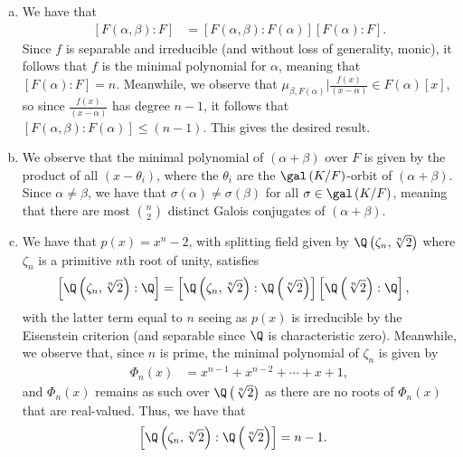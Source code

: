 \documentclass[10pt]{mypackage}
\begin{document}
\begin{solution}\hfill
  \begin{enumerate}[(a)]
    \item We have that
      \begin{align*}
        \left[ F\left( \alpha,\beta \right):F \right] &= \left[ F\left( \alpha,\beta \right):F\left( \alpha \right) \right]\left[ F\left( \alpha \right):F \right].
      \end{align*}
      Since $f$ is separable and irreducible (and without loss of generality, monic), it follows that $f$ is the minimal polynomial for $\alpha$, meaning that $\left[ F\left( \alpha \right):F \right] = n$. Meanwhile, we observe that $\mu_{\beta,F\left( \alpha \right)} | \frac{f(x)}{\left( x-\alpha \right)}\in F\left( \alpha \right)\left[ x \right]$, so since $\frac{f\left( x \right)}{\left( x-\alpha \right)}$ has degree $n-1$, it follows that $\left[ F\left( \alpha,\beta \right):F\left( \alpha \right) \right]\leq \left( n-1 \right)$. This gives the desired result.
    \item We observe that the minimal polynomial of $\left( \alpha + \beta \right)$ over $F$ is given by the product of all $\left( x-\theta_i \right)$, where the $\theta_i$ are the $\gal\left( K/F \right)$-orbit of $\left( \alpha + \beta\right)$. Since $\alpha\neq \beta$, we have that $\sigma(\alpha)\neq \sigma(\beta)$ for all $\sigma\in \gal\left( K/F \right)$, meaning that there are most ${n\choose 2}$ distinct Galois conjugates of $\left( \alpha + \beta \right)$.
    \item We have that $p(x) = x^{n}-2$, with splitting field given by $\Q\left( \zeta_n,\sqrt[n]{2} \right)$ where $\zeta_n$ is a primitive $n$th root of unity, satisfies
      \begin{align*}
        \left[ \Q\left( \zeta_n,\sqrt[n]{2} \right):\Q \right] &= \left[ \Q\left( \zeta_n,\sqrt[n]{2} \right):\Q\left( \sqrt[n]{2} \right) \right]\left[ \Q\left( \sqrt[n]{2} \right):\Q \right],
      \end{align*}
      with the latter term equal to $n$ seeing as $p(x)$ is irreducible by the Eisenstein criterion (and separable since $\Q$ is characteristic zero). Meanwhile, we observe that, since $n$ is prime, the minimal polynomial of $\zeta_n$ is given by
      \begin{align*}
        \Phi_n(x) &= x^{n-1} + x^{n-2} + \cdots + x + 1,
      \end{align*}
      and $\Phi_n(x)$ remains as such over $\Q\left( \sqrt[n]{2} \right)$ as there are no roots of $\Phi_n(x)$ that are real-valued. Thus, we have that
      \begin{align*}
        \left[ \Q\left( \zeta_n,\sqrt[n]{2} \right):\Q\left( \sqrt[n]{2} \right) \right] &= n-1.
      \end{align*}
  \end{enumerate}
\end{solution}
\end{document}
